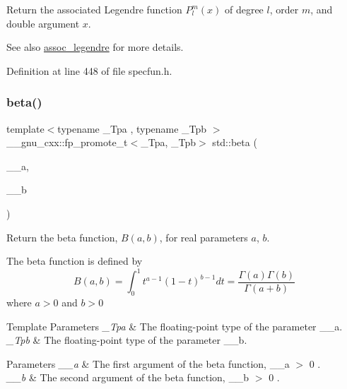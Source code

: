 Return the associated Legendre function $ P_l^m(x) $ of degree $ l $, order $ m $, and { double} argument $ x $.

\begin{DoxySeeAlso}{See also}
\hyperlink{group__tr29124__math__spec__func_ga7aa4182446f687094b12688078517d53}{assoc\+\_\+legendre} for more details. 
\end{DoxySeeAlso}


Definition at line 448 of file specfun.\+h.

\mbox{\label{group__tr29124__math__spec__func_gacd36403ae64b89840b1504f97024dcee}} 
\subsubsection{\texorpdfstring{beta()}{beta()}}
{\footnotesize\ttfamily template$<$typename \+\_\+\+Tpa , typename \+\_\+\+Tpb $>$ \\
\+\_\+\+\_\+gnu\+\_\+cxx\+::fp\+\_\+promote\+\_\+t$<$\+\_\+\+Tpa, \+\_\+\+Tpb$>$ std\+::beta (\begin{DoxyParamCaption}\item[{\+\_\+\+Tpa}]{\+\_\+\+\_\+a,  }\item[{\+\_\+\+Tpb}]{\+\_\+\+\_\+b }\end{DoxyParamCaption})\hspace{0.3cm}{\ttfamily [inline]}}

Return the beta function, $B(a,b)$, for real parameters $ a $, $ b $.

The beta function is defined by \[ B(a,b) = \int_0^1 t^{a - 1} (1 - t)^{b - 1} dt = \frac{\Gamma(a)\Gamma(b)}{\Gamma(a+b)} \] where $ a > 0 $ and $ b > 0 $


\begin{DoxyTemplParams}{Template Parameters}
{\em \+\_\+\+Tpa} & The floating-\/point type of the parameter {\ttfamily \+\_\+\+\_\+a}. \\
\hline
{\em \+\_\+\+Tpb} & The floating-\/point type of the parameter {\ttfamily \+\_\+\+\_\+b}. \\
\hline
\end{DoxyTemplParams}

\begin{DoxyParams}{Parameters}
{\em \+\_\+\+\_\+a} & The first argument of the beta function, {\ttfamily  \+\_\+\+\_\+a $>$ 0 }. \\
\hline
{\em \+\_\+\+\_\+b} & The second argument of the beta function, {\ttfamily  \+\_\+\+\_\+b $>$ 0 }. \\
\hline
\end{DoxyParams}

